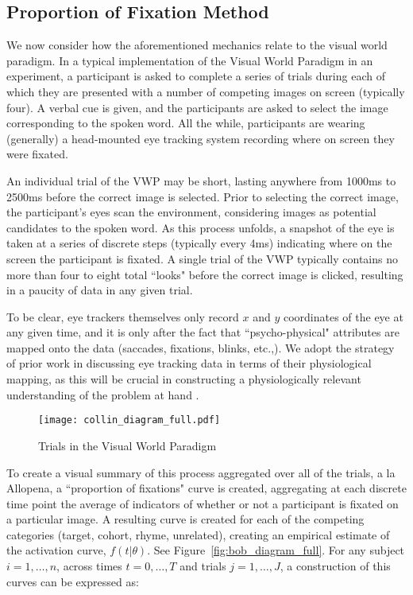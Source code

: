 \subsection{Proportion of Fixation Method}


We now consider how the aforementioned mechanics relate to the visual world paradigm. In a typical implementation of the Visual World Paradigm in an experiment, a participant is asked to complete a series of trials during each of which they are presented with a number of competing images on screen (typically four). A verbal cue is given, and the participants are asked to select the image corresponding to the spoken word. All the while, participants are wearing (generally) a head-mounted eye tracking system recording where on screen they were fixated. 

An individual trial of the VWP may be short, lasting anywhere from 1000ms to 2500ms before the correct image is selected. Prior to selecting the correct image, the participant's eyes scan the environment, considering images as potential candidates to the spoken word. As this process unfolds, a snapshot of the eye is taken at a series of discrete steps (typically every 4ms) indicating where on the screen the participant is fixated. A single trial of the VWP typically contains no more than four to eight total ``looks" before the correct image is clicked, resulting in a paucity of data in any given trial.

To be clear, eye trackers themselves only record $x$ and $y$ coordinates of the eye at any given time, and it is only after the fact that ``psycho-physical" attributes are mapped onto the data (saccades, fixations, blinks, etc.,). We adopt the strategy of prior work in discussing eye tracking data in terms of their physiological mapping, as this will be crucial in constructing a physiologically relevant understanding of the problem at hand \cite{mcmurray2002look}.

\begin{figure}[H]
\centering
\texttt{[image: collin\_diagram\_full.pdf]}
\caption{Trials in the Visual World Paradigm}
\label{fig:collin_diagram_full}
\end{figure}


To create a visual summary of this process aggregated over all of the trials, a la Allopena, a ``proportion of fixations" curve is created, aggregating at each discrete time point the average of indicators of whether or not a participant is fixated on a particular image. A resulting curve is created for each of the competing categories (target, cohort, rhyme, unrelated), creating an empirical estimate of the activation curve, $f(t|\theta)$. See Figure~\ref{fig:bob_diagram_full}. For any subject $i = 1, \dots, n$, across times $t = 0, \dots, T$ and trials $j = 1, \dots, J$, a construction  of this curves can be expressed as:


